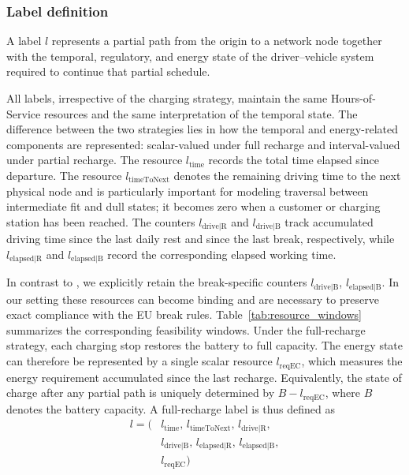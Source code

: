 \documentclass[3p,11pt,authoryear]{elsarticle}  %
\begin{document}
\subsubsection{Label definition}

A label \(l\) represents a partial path from the origin to a network node together with the temporal, regulatory, and energy state of the driver--vehicle system required to continue that partial schedule.

All labels, irrespective of the charging strategy, maintain the same Hours-of-Service resources and the same interpretation of the temporal state. The difference between the two strategies lies in how the temporal and energy-related components are represented: scalar-valued under full recharge and interval-valued under partial recharge. The resource \(l_{\text{time}}\) records the total time elapsed since departure. The resource \(l_{\text{timeToNext}}\) denotes the remaining driving time to the next physical node and is particularly important for modeling traversal between intermediate fit and dull states; it becomes zero when a customer or charging station has been reached. The counters \(l_{\text{drive|R}}\) and \(l_{\text{drive|B}}\) track accumulated driving time since the last daily rest and since the last break, respectively, while \(l_{\text{elapsed|R}}\) and \(l_{\text{elapsed|B}}\) record the corresponding elapsed working time. 


In contrast to \citet{goel2017exact}, we explicitly retain the break-specific counters \(l_{\text{drive|B}}\), \(l_{\text{elapsed|B}}\). In our setting these resources can become binding and are necessary to preserve exact compliance with the EU break rules. Table~\ref{tab:resource_windows} summarizes the corresponding feasibility windows. Under the full-recharge strategy, each charging stop restores the battery to full capacity. The energy state can therefore be represented by a single scalar resource \(l_{\text{reqEC}}\), which measures the energy requirement accumulated since the last recharge. Equivalently, the state of charge after any partial path is uniquely determined by \(B-l_{\text{reqEC}}\), where \(B\) denotes the battery capacity. A full-recharge label is thus defined as
\[
\begin{aligned}
l = (&l_{\text{time}},\, l_{\text{timeToNext}},\, l_{\text{drive|R}},\\
     &l_{\text{drive|B}},\, l_{\text{elapsed|R}},\, l_{\text{elapsed|B}},\\
     &l_{\text{reqEC}})
\end{aligned}
\]
\end{document}
